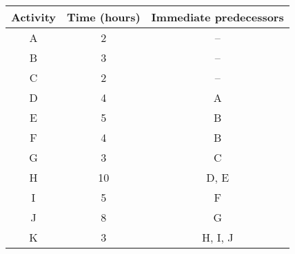 
    \centering
    \begin{tabular}{|c|c|c|}
        \hline
        \textbf{Activity} & \textbf{Time (hours)} & \textbf{Immediate predecessors} \\
        \hline
        A & 2 & -- \\
        \hline
        B & 3 & -- \\
                \hline
        C & 2 & -- \\
        \hline
        D & 4 & A \\
        \hline
        E & 5 & B \\
        \hline
        F & 4 & B \\
        \hline
        G & 3 & C \\
        \hline
        H & 10 & D, E \\
        \hline
        I & 5 & F \\
        \hline
        J & 8 & G \\
        \hline
        K & 3 & H, I, J \\
        \hline
    \end{tabular}

